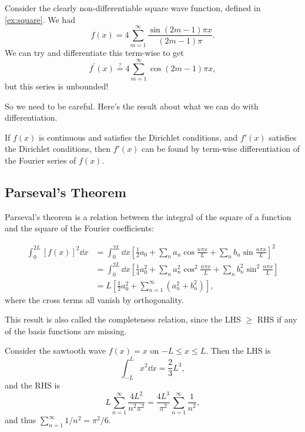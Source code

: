 \begin{example}
    Consider the clearly non-differentiable square wave function, defined in \autoref{ex:square}. We had
    $$
    f(x)=4 \sum_{m=1}^{\infty} \frac{\sin (2 m-1) \pi x}{(2 m-1) \pi}.
    $$
    We can try and differentiate this term-wise to get
    $$
    f^{\prime}(x) \stackrel{?}{=} 4 \sum_{m=1}^{\infty} \cos (2 m-1) \pi x,
    $$
    but this series is unbounded!
\end{example}

So we need to be careful. Here's the result about what we can do with differentiation.

\begin{theorem}
    If $f(x)$ is continuous and satisfies the Dirichlet conditions, and $f'(x)$ satisfies the Dirichlet conditions, then $f'(x)$ can be found by term-wise differentiation of the Fourier series of $f(x)$.
\end{theorem}

\subsection{Parseval's Theorem}

Parseval's theorem is a relation between the integral of the square of a function and the square of the Fourier coefficients:

\begin{align*}
    \int_{0}^{2L}[f(x)]^{2} \dd x&=\int_{0}^{2 L} \dd x\left[\frac{1}{2} a_{0}+\sum_{n} a_{n} \cos \frac{n \pi x}{L}+\sum_{n} b_{n} \sin \frac{n \pi x}{L}\right]^{2} \\
&= \int_{0}^{2 L} \dd x\left[\frac{1}{4} a_{0}^{2}+\sum_{n} a_{n}^{2} \cos ^{2} \frac{n \pi x}{L}+\sum_{n} b_{n}^{2} \sin ^{2} \frac{n \pi x}{L}\right] \\
&= L\left[\frac{1}{2} a_{0}^{2}+\sum_{n=1}^{\infty}\left(a_{n}^{2}+b_{n}^{2}\right)\right],
\end{align*}
where the cross terms all vanish by orthogonality.

This result is also called the completeness relation, since the LHS $\geq$ RHS if any of the basis functions are missing.

\begin{example}
    Consider the sawtooth wave $f(x) = x$ on $-L \leq x \leq L$. Then the LHS is
    $$
    \int_{-L}^{L} x^2 \dd x = \frac{2}{3}L^3,
    $$
    and the RHS is
    $$
    L \sum_{n = 1}^{\infty} \frac{4L^2}{n^2 \pi^2} = \frac{4L^3}{\pi^2}\sum_{n = 1}^{\infty} \frac{1}{n^2},
    $$
    and thus $\sum_{n = 1}^{\infty} 1/n^2 = \pi^2/6$.
\end{example}


